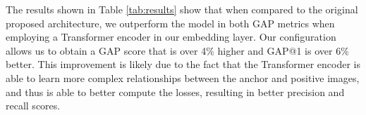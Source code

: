 \documentclass[10pt,twocolumn,letterpaper]{article}
\begin{document}
The results shown in Table \ref{tab:results} show that when
compared to the original proposed architecture, we outperform the model in both GAP metrics when employing a Transformer encoder in our embedding layer. Our configuration
allows us to obtain a GAP score that is over 4\% higher and GAP@1 is over 6\% better. This improvement is likely due to the fact that the Transformer encoder is able to
learn more complex relationships between the anchor and positive images, and thus is able to better compute the losses, resulting in better precision and recall scores. 

\end{document}
